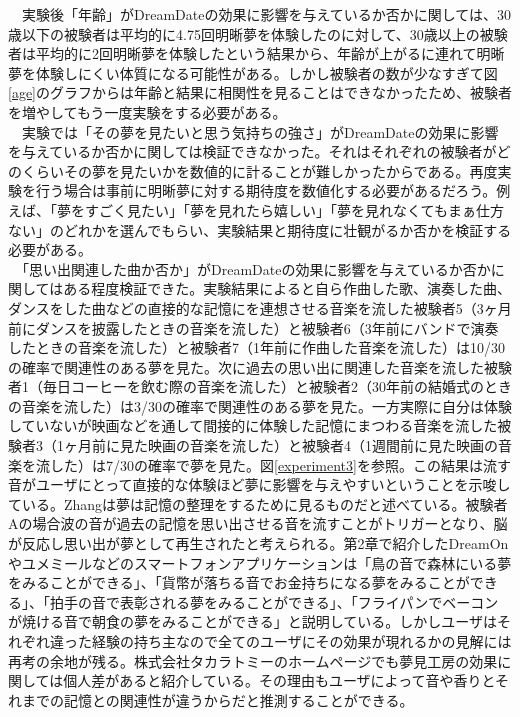 　実験後「年齢」がDreamDateの効果に影響を与えているか否かに関しては、30歳以下の被験者は平均的に4.75回明晰夢を体験したのに対して、30歳以上の被験者は平均的に2回明晰夢を体験したという結果から、年齢が上がるに連れて明晰夢を体験しにくい体質になる可能性がある。しかし被験者の数が少なすぎて図\ref{age}のグラフからは年齢と結果に相関性を見ることはできなかったため、被験者を増やしてもう一度実験をする必要がある。\\
　実験では「その夢を見たいと思う気持ちの強さ」がDreamDateの効果に影響を与えているか否かに関しては検証できなかった。それはそれぞれの被験者がどのくらいその夢を見たいかを数値的に計ることが難しかったからである。再度実験を行う場合は事前に明晰夢に対する期待度を数値化する必要があるだろう。例えば、「夢をすごく見たい」「夢を見れたら嬉しい」「夢を見れなくてもまぁ仕方ない」のどれかを選んでもらい、実験結果と期待度に壮観がるか否かを検証する必要がある。\\
　「思い出関連した曲か否か」がDreamDateの効果に影響を与えているか否かに関してはある程度検証できた。実験結果によると自ら作曲した歌、演奏した曲、ダンスをした曲などの直接的な記憶にを連想させる音楽を流した被験者5（3ヶ月前にダンスを披露したときの音楽を流した）と被験者6（3年前にバンドで演奏したときの音楽を流した）と被験者7（1年前に作曲した音楽を流した）は10/30の確率で関連性のある夢を見た。次に過去の思い出に関連した音楽を流した被験者1（毎日コーヒーを飲む際の音楽を流した）と被験者2（30年前の結婚式のときの音楽を流した）は3/30の確率で関連性のある夢を見た。一方実際に自分は体験していないが映画などを通して間接的に体験した記憶にまつわる音楽を流した被験者3（1ヶ月前に見た映画の音楽を流した）と被験者4（1週間前に見た映画の音楽を流した）は7/30の確率で夢を見た。図\ref{experiment3}を参照。この結果は流す音がユーザにとって直接的な体験ほど夢に影響を与えやすいということを示唆している。Zhangは夢は記憶の整理をするために見るものだと述べている\cite{Zhang}。被験者Aの場合波の音が過去の記憶を思い出させる音を流すことがトリガーとなり、脳が反応し思い出が夢として再生されたと考えられる。第2章で紹介したDreamOnやユメミールなどのスマートフォンアプリケーションは「鳥の音で森林にいる夢をみることができる」、「貨幣が落ちる音でお金持ちになる夢をみることができる」、「拍手の音で表彰される夢をみることができる」、「フライパンでベーコンが焼ける音で朝食の夢をみることができる」と説明している。しかしユーザはそれぞれ違った経験の持ち主なので全てのユーザにその効果が現れるかの見解には再考の余地が残る。株式会社タカラトミーのホームページでも夢見工房の効果に関しては個人差があると紹介している。その理由もユーザによって音や香りとそれまでの記憶との関連性が違うからだと推測することができる。\\
